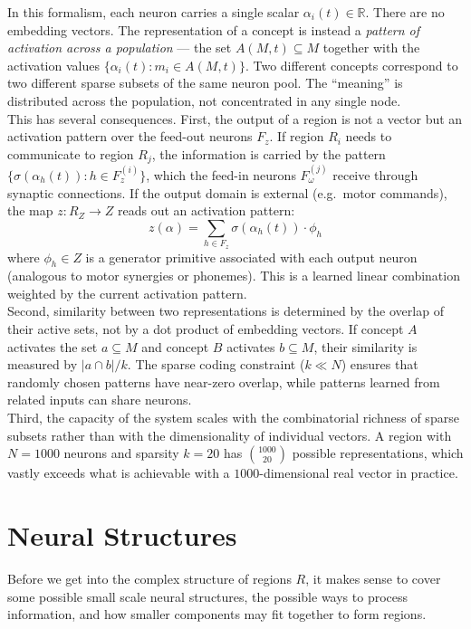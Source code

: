 \documentclass[11pt]{article}
\begin{document}
In this formalism, each neuron carries a single scalar $\alpha_i(t) \in \mathbb{R}$. There are no embedding vectors. The representation of a concept is instead a \textit{pattern of activation across a population} --- the set $A(M, t) \subseteq M$ together with the activation values $\{\alpha_i(t) : m_i \in A(M, t)\}$. Two different concepts correspond to two different sparse subsets of the same neuron pool. The ``meaning'' is distributed across the population, not concentrated in any single node.\\

This has several consequences. First, the output of a region is not a vector but an activation pattern over the feed-out neurons $F_z$. If region $R_i$ needs to communicate to region $R_j$, the information is carried by the pattern $\{\sigma(\alpha_h(t)) : h \in F_z^{(i)}\}$, which the feed-in neurons $F_\omega^{(j)}$ receive through synaptic connections. If the output domain is external (e.g.\ motor commands), the map $z: R_Z \to Z$ reads out an activation pattern:
\begin{equation}
    z(\alpha) = \sum_{h \in F_z} \sigma(\alpha_h(t)) \cdot \phi_h
\end{equation}
where $\phi_h \in Z$ is a generator primitive associated with each output neuron (analogous to motor synergies or phonemes). This is a learned linear combination weighted by the current activation pattern.\\

Second, similarity between two representations is determined by the overlap of their active sets, not by a dot product of embedding vectors. If concept $A$ activates the set $a \subseteq M$ and concept $B$ activates $b \subseteq M$, their similarity is measured by $|a \cap b| / k$. The sparse coding constraint ($k \ll N$) ensures that randomly chosen patterns have near-zero overlap, while patterns learned from related inputs can share neurons.\\

Third, the capacity of the system scales with the combinatorial richness of sparse subsets rather than with the dimensionality of individual vectors. A region with $N = 1000$ neurons and sparsity $k = 20$ has $\binom{1000}{20}$ possible representations, which vastly exceeds what is achievable with a $1000$-dimensional real vector in practice.


\section{Neural Structures}
Before we get into the complex structure of regions $R$, it makes sense to cover some possible small scale neural structures, the possible ways to process information, and how smaller components may fit together to form regions.
\end{document}
